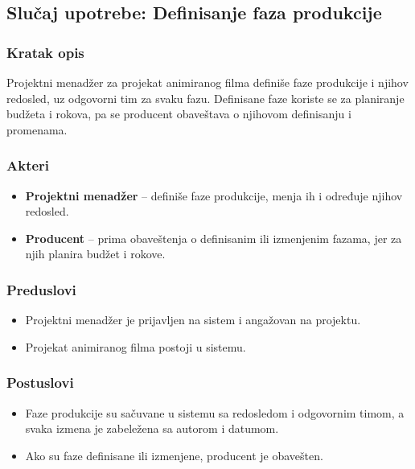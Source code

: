 \subsection{Slučaj upotrebe: Definisanje faza produkcije}

\subsubsection*{Kratak opis}

Projektni menadžer za projekat animiranog filma definiše faze produkcije i njihov redosled, uz odgovorni tim za svaku fazu. Definisane faze koriste se za planiranje budžeta i rokova, pa se producent obaveštava o njihovom definisanju i promenama.

\subsubsection*{Akteri}
\begin{itemize}
    \item \textbf{Projektni menadžer} -- definiše faze produkcije, menja ih i određuje njihov redosled.
    \item \textbf{Producent} -- prima obaveštenja o definisanim ili izmenjenim fazama, jer za njih planira budžet i rokove.
\end{itemize}

\subsubsection*{Preduslovi}
\begin{itemize}
    \item Projektni menadžer je prijavljen na sistem i angažovan na projektu.
    \item Projekat animiranog filma postoji u sistemu.
\end{itemize}

\subsubsection*{Postuslovi}
\begin{itemize}
    \item Faze produkcije su sačuvane u sistemu sa redosledom i odgovornim timom, a svaka izmena je zabeležena sa autorom i datumom.
    \item Ako su faze definisane ili izmenjene, producent je obavešten.
\end{itemize}

